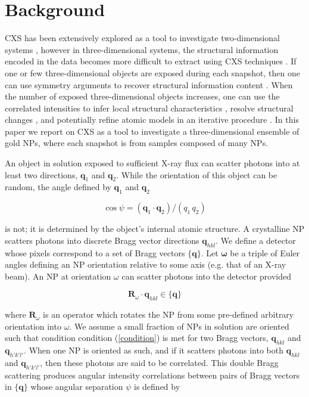 \documentclass [12pt,fleqn]{article}
\def \be {\begin{equation}}
\def \ee {\end{equation}}
\begin{document}
\section{Background}
CXS has been extensively explored as a tool to investigate two-dimensional systems \cite{kurta2013xray, schroer2014characteristics, lehmkuhler2014detecting, kurta2012xray, pedrini2013two, saldin2011new}, however in three-dimensional systems, the structural information encoded in the data becomes more difficult to extract using  CXS techniques \cite{elser2011strategies}. If one or few three-dimensional objects are exposed during each snapshot, then one can use symmetry arguments to recover structural information content \cite{kam1980reconstruction, poon2015use, chen2012structure, liu2013three, starodub2012single, saldin2011reconstructing}. When the number of exposed three-dimensional objects increases, one can use the correlated intensities to infer local structural characteristics \cite{wochner2009x, altarelli2010x, kurta2013cross, malmerberg2015operational}, resolve structural changes \cite{pande2015simulations}, and potentially refine atomic models in an iterative procedure \cite{liu2012computation}. In this paper we report on CXS as a tool to investigate a three-dimensional ensemble of gold NPs, where each snapshot is from samples composed of many NPs.

An object in solution exposed to sufficient X-ray flux can scatter photons into at least two directions, $\bm q_1$ and $\bm q_2$. While the orientation of this object can be random, the angle defined by $\bm q_1$ and $\bm q_2$ 

\be \label{cpsi}
\cos \psi = (\bm q_1 \cdot \bm q_2)/(q_1 \, q_2 )
\ee

is not; it is determined by the object's internal atomic structure. A crystalline NP scatters photons into discrete  Bragg vector directions $\bm q_{hkl}$. We define a detector whose pixels correspond to a set of Bragg vectors $\{\bm q\}$. Let $\bm \omega$ be a triple of Euler angles defining an NP orientation relative to some axis (e.g. that of an X-ray beam). An NP at orientation $\omega$ can scatter photons into the detector provided

\be \label{condition}
\bm R_\omega \cdot \bm q_{hkl} \in \{\bm q\}
\ee

where $\bm R_\omega$ is an operator which rotates the NP from some pre-defined arbitrary orientation into $\omega$. We assume a small fraction of NPs in solution are oriented such that condition condition (\ref{condition}) is met for two Bragg vectors, $\bm q_{hkl}$ and $\bm q_{h'k'l'}$. When one NP is oriented as such, and if it scatters photons into both $\bm q_{hkl}$ and $\bm q_{h'k'l'}$, then these photons are said to be correlated. This double Bragg scattering produces angular intensity correlations between pairs of Bragg vectors in $\{\bm q\}$ whose angular separation $\psi$ is defined by
\end{document}
